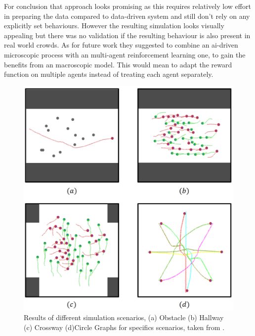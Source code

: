 \documentclass[sigconf]{acmart}
\begin{document}
For conclusion that approach looks promising as this requires relatively low effort in preparing the data compared to data-driven system and still don't rely on any explicitly set behaviours. However the resulting simulation looks visually appealing but there was no validation if the resulting behaviour is also present in real world crowds. As for future work they suggested to combine an ai-driven microscopic process with an multi-agent reinforcement learning one, to gain the benefits from an macroscopic model. This would mean to adapt the reward function on multiple agents instead of treating each agent separately.  

\begin{figure}[h]
  \centering
  \includegraphics[width=1\linewidth]{images/aiSituations.png}
  \caption{Results of different simulation scenarios, (a) Obstacle (b) Hallway (c) Crossway (d)Circle  Graphs for specifics scenarios, taken from \cite{lee_crowd_2018}.
  }
  \label{fig:aiScenarios}
\end{figure}
\end{document}
